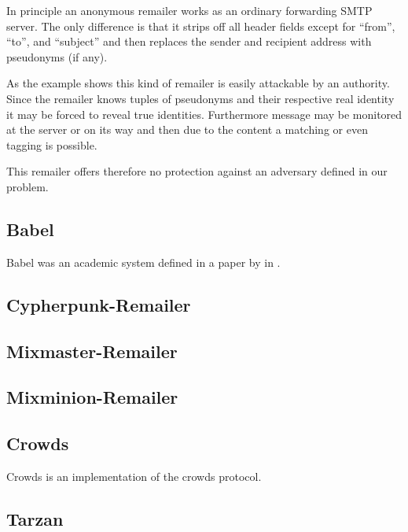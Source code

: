 In principle an anonymous remailer works as an ordinary forwarding SMTP server. The only difference is that it strips off all header fields except for ``from'', ``to'', and ``subject'' and then replaces the sender and recipient address with pseudonyms (if any). 

As the example shows this kind of remailer is easily attackable by an authority. Since the remailer knows tuples of pseudonyms and their respective real identity it may be forced to reveal true identities. Furthermore message may be monitored at the server or on its way and then due to the content a matching or even tagging is possible.

This remailer offers therefore no protection against an adversary defined in our problem.

\subsection{Babel}
Babel was an academic system defined in a paper by \citeauthor{babel} in \citeyear{babel}\cite{babel}.


\subsection{Cypherpunk-Remailer\label{sec:remCypherpunk}}

\subsection{Mixmaster-Remailer\label{sec:remMixmaster}}

\subsection{Mixminion-Remailer\label{sec:remMixminion}}

\subsection{Crowds}
Crowds is an implementation of the crowds protocol.


\subsection{Tarzan}

